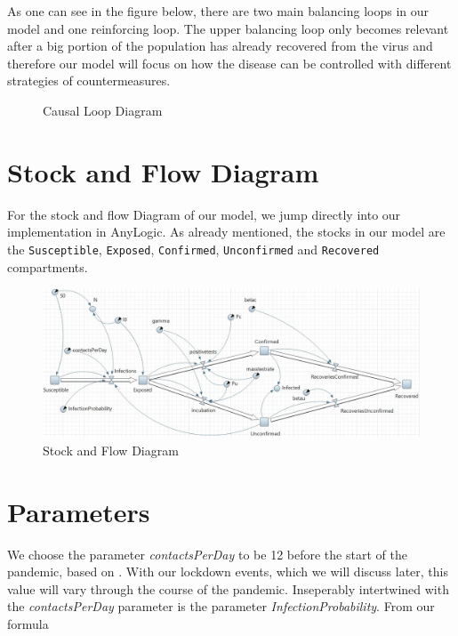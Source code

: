 \documentclass
[
    a4paper,
    11pt,
    bibliography = totoc,
    listof = totoc,
    headinclude = true,
]
{scrreport}
\begin{document}
As one can see in the figure below, there are two main balancing loops
in our model and one reinforcing loop. The upper balancing loop only
becomes relevant after a big portion of the population has already recovered
from the virus and therefore our model will focus on how the disease can
be controlled with different strategies of countermeasures.

\begin{figure}[hbt!]
  \caption{Causal Loop Diagram}
  
\end{figure}

\section{Stock and Flow Diagram}

For the stock and flow Diagram of our model, we jump directly into
our implementation in AnyLogic. As already mentioned, the stocks in our model
are the \texttt{Susceptible}, \texttt{Exposed}, \texttt{Confirmed}, \texttt{Unconfirmed} and \texttt{Recovered} compartments.

\begin{figure}[hbt!]
  \caption{Stock and Flow Diagram}
  \includegraphics[width=\linewidth]{../AnyLogicSIR.JPG}
\end{figure}

\FloatBarrier

\section{Parameters}

We choose the parameter \textit{contactsPerDay} to be 12 before the start of the pandemic,
based on \cite{Spiegel}. With our lockdown events, which we will discuss
later, this value will vary through the course of the pandemic.
Inseperably intertwined with the \textit{contactsPerDay} parameter is the parameter \textit{InfectionProbability}. From our formula
\end{document}

